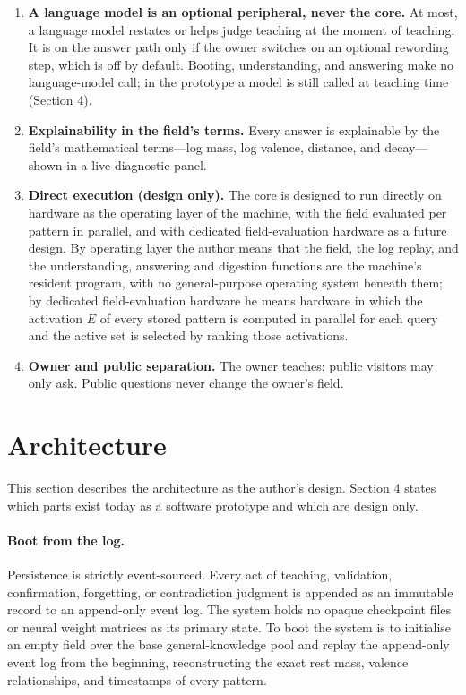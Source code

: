 \documentclass[11pt]{article}
\theoremstyle{remark}
\begin{document}
\begin{enumerate}
\item \textbf{A language model is an optional peripheral, never the core.} At most, a language model restates or helps judge teaching at the moment of teaching. It is on the answer path only if the owner switches on an optional rewording step, which is off by default. Booting, understanding, and answering make no language-model call; in the prototype a model is still called at teaching time (Section 4).

\item \textbf{Explainability in the field's terms.} Every answer is explainable by the field's mathematical terms---log mass, log valence, distance, and decay---shown in a live diagnostic panel.

\item \textbf{Direct execution (design only).} The core is designed to run directly on hardware as the operating layer of the machine, with the field evaluated per pattern in parallel, and with dedicated field-evaluation hardware as a future design. By operating layer the author means that the field, the log replay, and the understanding, answering and digestion functions are the machine's resident program, with no general-purpose operating system beneath them; by dedicated field-evaluation hardware he means hardware in which the activation $E$ of every stored pattern is computed in parallel for each query and the active set is selected by ranking those activations.

\item \textbf{Owner and public separation.} The owner teaches; public visitors may only ask. Public questions never change the owner's field.
\end{enumerate}

\section{Architecture}

This section describes the architecture as the author's design. Section 4 states which parts exist today as a software prototype and which are design only.

\paragraph{Boot from the log.}
Persistence is strictly event-sourced. Every act of teaching, validation, confirmation, forgetting, or contradiction judgment is appended as an immutable record to an append-only event log. The system holds no opaque checkpoint files or neural weight matrices as its primary state. To boot the system is to initialise an empty field over the base general-knowledge pool and replay the append-only event log from the beginning, reconstructing the exact rest mass, valence relationships, and timestamps of every pattern.
\end{document}
